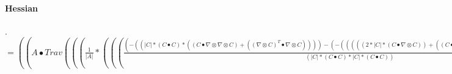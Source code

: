 \documentclass{article}
\begin{document}
\paragraph{Hessian}.
 $= ((A \bullet Trav((( \frac{1}{|A|}*((( \frac{(-((|C|*(C \bullet C)*((C \bullet  \nabla  \otimes  \nabla  \otimes C)+(( \nabla  \otimes C)^T \bullet  \nabla  \otimes C))))-(-(((((2*|C|*(C \bullet  \nabla  \otimes C))+((C \bullet C)* \frac{(C \bullet  \nabla  \otimes C)}{|C|}))*(C \bullet  \nabla  \otimes C)))))^T)}{(|C|*(C \bullet C)*|C|*(C \bullet C))}*C))+Trav((( \nabla  \otimes C* \frac{-(((C \bullet  \nabla  \otimes C)))}{(|C|*(C \bullet C))})))<2,:,0>+Trav(( \frac{1}{|C|}* \nabla  \otimes  \nabla  \otimes C))<1,2,0>+Trav((( \frac{-(((C \bullet  \nabla  \otimes C)))}{(|C|*(C \bullet C))}* \nabla  \otimes C)))<2,0,1>))+Trav((( \frac{-(((A \bullet  \nabla  \otimes A)))}{(|A|*(A \bullet A))}*((( \frac{-(((C \bullet  \nabla  \otimes C)))}{(|C|*(C \bullet C))}*C))+(( \frac{1}{|C|}* \nabla  \otimes C))^T))))<1,0,:>+(( \frac{(-((|A|*|C|*(A \bullet A)*((A \bullet  \nabla  \otimes  \nabla  \otimes A)+(( \nabla  \otimes A)^T \bullet  \nabla  \otimes A))))-(-(((((|A|*((2*|C|*(A \bullet  \nabla  \otimes A))+((A \bullet A)* \frac{(C \bullet  \nabla  \otimes C)}{|C|})))+(|C|*(A \bullet A)* \frac{(A \bullet  \nabla  \otimes A)}{|A|}))*(A \bullet  \nabla  \otimes A)))))^T)}{(|A|*|C|*(A \bullet A)*|A|*|C|*(A \bullet A))}*C))+Trav((( \nabla  \otimes C* \frac{-(((A \bullet  \nabla  \otimes A)))}{(|A|*|C|*(A \bullet A))})))<2,:,0>))<1,2,0>)+((( \frac{1}{|A|}*((( \frac{-(((C \bullet  \nabla  \otimes C)))}{(|C|*(C \bullet C))}*C))+(( \frac{1}{|C|}* \nabla  \otimes C))^T))+(( \frac{-(((A \bullet  \nabla  \otimes A)))}{(|A|*|C|*(A \bullet A))}*C))) \bullet  \nabla  \otimes A)+( \frac{1}{|A|}*((C \bullet Trav((Trav(( \frac{1}{|C|}* \nabla  \otimes  \nabla  \otimes A))<1,2,0>+Trav((( \frac{-(((C \bullet  \nabla  \otimes C)))}{(|C|*(C \bullet C))}* \nabla  \otimes A)))<2,0,1>))<1,2,0>)+( \frac{1}{|C|}*(( \nabla  \otimes A)^T \bullet  \nabla  \otimes C))))+( \frac{1}{|C|}*((C \bullet  \nabla  \otimes A) \otimes  \frac{-(((A \bullet  \nabla  \otimes A)))}{(|A|*(A \bullet A))})))$
\end{document}
